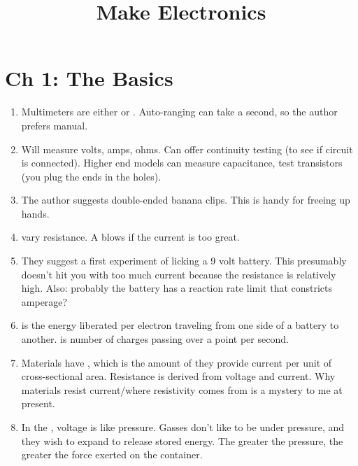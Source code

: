 \documentclass[11pt, oneside]{amsart}
\begin{document}
\title{Make Electronics}
\maketitle

\section{Ch 1: The Basics}

\begin{enumerate}
  \item Multimeters are either  or .
  Auto-ranging can take a second, so the author prefers manual.

  \item Will measure volts, amps, ohms. Can offer continuity testing (to
  see if circuit is connected). Higher end models can measure
  capacitance, test transistors (you plug the ends in the holes).

  \item The author suggests double-ended banana clips. This is handy for
  freeing up hands.

  \item {} vary resistance. A  blows
  if the current is too great.

  \item They suggest a first experiment of licking a 9 volt battery.
  This presumably doesn't hit you with too much current because the
  resistance is relatively high. Also: probably the battery has a
  reaction rate limit that constricts amperage?

  \item {} is the energy liberated per electron traveling
  from one side of a battery to another.  is number of
  charges passing over a point per second.

  \item Materials have , which is the amount of
   they provide current per unit of cross-sectional
  area. Resistance is derived from voltage and current. Why materials
  resist current/where resistivity comes from is a mystery to me at
  present.

  \item In the , voltage is like pressure.
  Gasses don't like to be under pressure, and they wish to expand to
  release stored energy. The greater the pressure, the greater the force
  exerted on the container.


\end{enumerate}
\end{document}
